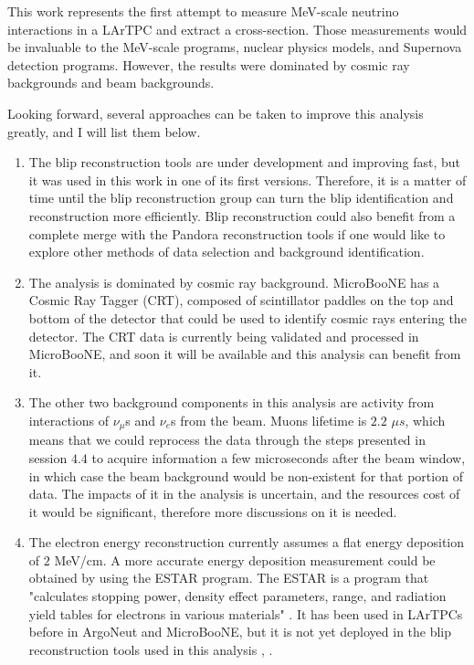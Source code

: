 
This work represents the first attempt to measure MeV-scale neutrino interactions in a LArTPC and extract a cross-section. Those measurements would be invaluable to the MeV-scale programs, nuclear physics models, and Supernova detection programs. 
However, the results were dominated by cosmic ray backgrounds and beam backgrounds. 

Looking  forward, several approaches can be taken to improve this analysis greatly, and I will list them below. 
\begin{enumerate}
 \item The blip reconstruction tools are under development and improving fast, but it was used in this work in one of its first versions. Therefore, it is a matter of time until the blip reconstruction group can turn the blip identification and reconstruction more efficiently. Blip reconstruction could also benefit from a complete merge with the Pandora reconstruction tools if one would like to explore other methods of data selection and background identification.

 \item The analysis is dominated by cosmic ray background. MicroBooNE has a Cosmic Ray Tagger (CRT), composed of scintillator paddles on the top and bottom of the detector that could be used to identify cosmic rays entering the detector. The CRT data is currently being validated and processed in MicroBooNE, and soon it will be available and this analysis can benefit from it. 
 
 \item The other two background components in this analysis are activity from interactions of $\nu_{\mu}$s and $\nu_{e}$s from the beam. Muons lifetime is $2.2$ $\mu s$, which means that we could reprocess the data through the steps presented in session $4.4$ to acquire information a few microseconds after the beam window, in which case the beam background would be non-existent for that portion of data. The impacts of it in the analysis is uncertain, and the resources cost of it would be significant, therefore more discussions on it is needed. 
 
 \item The electron energy reconstruction currently assumes a flat energy deposition of $2$ MeV/cm. A more accurate energy deposition measurement could be obtained by using the ESTAR program. The ESTAR is a program that "calculates stopping power, density effect parameters, range, and radiation yield tables for electrons in various materials" \cite{ESTAR}. It has been used in LArTPCs before in ArgoNeut and MicroBooNE, but it is not yet deployed in the blip reconstruction tools used in this analysis \cite{argoneut_mev}, \cite{microboone_mev}. 
 

\end{enumerate}
